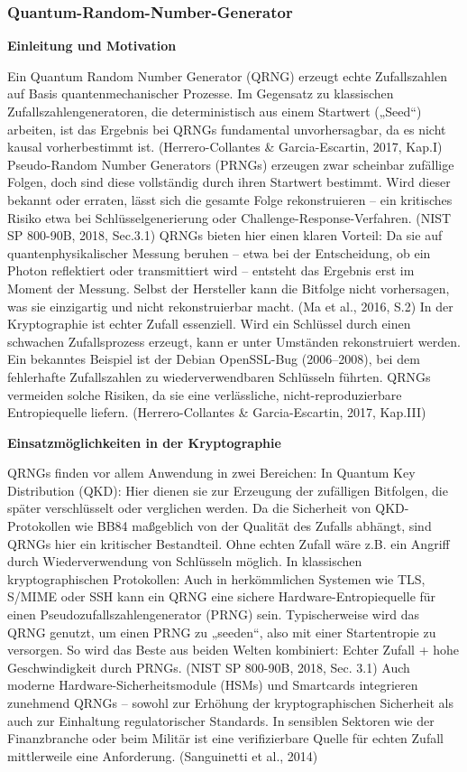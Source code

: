 \subsubsection{Quantum-Random-Number-Generator}
\noindent\textbf{Einleitung und Motivation}

\noindent
Ein Quantum Random Number Generator (QRNG) erzeugt echte Zufallszahlen auf Basis quantenmechanischer Prozesse. Im Gegensatz zu klassischen Zufallszahlengeneratoren, die deterministisch aus einem Startwert („Seed“) arbeiten, ist das Ergebnis bei QRNGs fundamental unvorhersagbar, da es nicht kausal vorherbestimmt ist.
 (Herrero-Collantes & Garcia-Escartin, 2017, Kap.I)
Pseudo-Random Number Generators (PRNGs) erzeugen zwar scheinbar zufällige Folgen, doch sind diese vollständig durch ihren Startwert bestimmt. Wird dieser bekannt oder erraten, lässt sich die gesamte Folge rekonstruieren – ein kritisches Risiko etwa bei Schlüsselgenerierung oder Challenge-Response-Verfahren.
 (NIST SP 800-90B, 2018, Sec.3.1)
QRNGs bieten hier einen klaren Vorteil: Da sie auf quantenphysikalischer Messung beruhen – etwa bei der Entscheidung, ob ein Photon reflektiert oder transmittiert wird – entsteht das Ergebnis erst im Moment der Messung. Selbst der Hersteller kann die Bitfolge nicht vorhersagen, was sie einzigartig und nicht rekonstruierbar macht.
 (Ma et al., 2016, S.2)
In der Kryptographie ist echter Zufall essenziell. Wird ein Schlüssel durch einen schwachen Zufallsprozess erzeugt, kann er unter Umständen rekonstruiert werden. Ein bekanntes Beispiel ist der Debian OpenSSL-Bug (2006–2008), bei dem fehlerhafte Zufallszahlen zu wiederverwendbaren Schlüsseln führten. QRNGs vermeiden solche Risiken, da sie eine verlässliche, nicht-reproduzierbare Entropiequelle liefern.
 (Herrero-Collantes & Garcia-Escartin, 2017, Kap.III)


\vspace{1em}
\noindent\textbf{Einsatzmöglichkeiten in der Kryptographie}

\noindent
QRNGs finden vor allem Anwendung in zwei Bereichen:
\smallskip
In Quantum Key Distribution (QKD): Hier dienen sie zur Erzeugung der zufälligen Bitfolgen, die später verschlüsselt oder verglichen werden. Da die Sicherheit von QKD-Protokollen wie BB84 maßgeblich von der Qualität des Zufalls abhängt, sind QRNGs hier ein kritischer Bestandteil. Ohne echten Zufall wäre z.B. ein Angriff durch Wiederverwendung von Schlüsseln möglich.
\smallskip
In klassischen kryptographischen Protokollen: Auch in herkömmlichen Systemen wie TLS, S/MIME oder SSH kann ein QRNG eine sichere Hardware-Entropiequelle für einen Pseudozufallszahlengenerator (PRNG) sein. Typischerweise wird das QRNG genutzt, um einen PRNG zu „seeden“, also mit einer Startentropie zu versorgen. So wird das Beste aus beiden Welten kombiniert: Echter Zufall + hohe Geschwindigkeit durch PRNGs.
\smallskip
(NIST SP 800-90B, 2018, Sec. 3.1)
Auch moderne Hardware-Sicherheitsmodule (HSMs) und Smartcards integrieren zunehmend QRNGs – sowohl zur Erhöhung der kryptographischen Sicherheit als auch zur Einhaltung regulatorischer Standards. In sensiblen Sektoren wie der Finanzbranche oder beim Militär ist eine verifizierbare Quelle für echten Zufall mittlerweile eine Anforderung.
(Sanguinetti et al., 2014)


